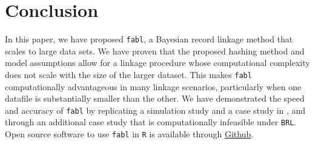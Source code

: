 \documentclass[ba]{imsart}
\begin{document}
	
	\section{Conclusion}
	\label{discussion}
	
	In this paper, we have proposed \texttt{fabl}, a Bayesian record linkage method that scales to large data sets. We have proven that the proposed hashing method
	and model assumptions allow for a linkage procedure whose computational complexity does not scale with the size of the larger dataset. This makes \texttt{fabl} computationally advantageous in many linkage scenarios, particularly when one datafile is substantially smaller than the other. We have demonstrated the speed and accuracy of \texttt{fabl} by replicating a simulation study and a case study in \cite{sadinle_bayesian_2017}, and through an additional case study that is computationally infeasible under \texttt{BRL}. Open source software to use \texttt{fabl} in \texttt{R} is available through \href{https://github.com/briankundinger/parlrdev}{Github}.
	
\end{document}
